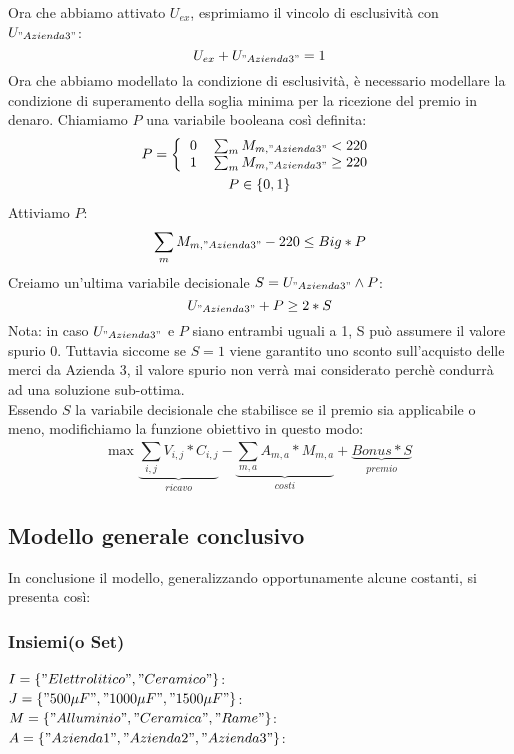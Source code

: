 \documentclass[11pt,a4paper]{article}
\begin{document}
Ora che abbiamo attivato $U_{ex}$, esprimiamo il vincolo di esclusività con $U_{"Azienda 3"}$: \\
\begin{equation}
U_{ex} + U_{"Azienda 3"} = 1
\end{equation}
Ora che abbiamo modellato la condizione di esclusività, è necessario modellare la condizione di superamento della soglia minima per la ricezione del premio in denaro. Chiamiamo $P$ una variabile booleana così definita:
\begin{gather*}
P=\left \{
\begin{tabular}{cc}
0 & $\sum_{m} M_{m,"Azienda 3"} <220$ \\
1 & $\sum_{m} M_{m,"Azienda 3"} \geq 220$
\end{tabular}
\right. \\
P \in \{ 0,1\} \\
\end{gather*}
Attiviamo $P$:
\begin{equation}
\sum_{m} M_{m,"Azienda 3"} -220\leq Big*P
\end{equation}
Creiamo un'ultima variabile decisionale $S=U_{"Azienda 3"} \land P$: \\
\begin{equation}
U_{"Azienda 3"} + P \geq 2*S
\end{equation}
Nota: in caso $U_{"Azienda 3"}$ e $P$ siano entrambi uguali a 1, S può assumere il valore spurio 0. Tuttavia siccome se $S=1$ viene garantito uno sconto sull'acquisto delle merci da Azienda 3, il valore spurio non verrà mai considerato perchè condurrà ad una soluzione sub-ottima. \\
Essendo $S$ la variabile decisionale che stabilisce se il premio sia applicabile o meno, modifichiamo la funzione obiettivo in questo modo: \\
\begin{equation}
\text{max } \underbrace{\sum_{i,j}^{} V_{i,j}*C_{i,j}}_{ricavo} - \underbrace{\sum_{m,a} A_{m,a}*M_{m,a}}_{costi} + \underbrace{Bonus*S}_{premio}
\end{equation}
\subsection{Modello generale conclusivo}
In conclusione il modello, generalizzando opportunamente alcune costanti, si presenta così: \\
\subsubsection{Insiemi(o Set)}
$I=\{"Elettrolitico","Ceramico"\}$: \\
$J=\{"500 \mu F","1000 \mu F","1500 \mu F"\}$: \\
$M=\{"Alluminio","Ceramica","Rame"\}$: \\
$A=\{"Azienda 1","Azienda 2","Azienda 3"\}$:
\end{document}

